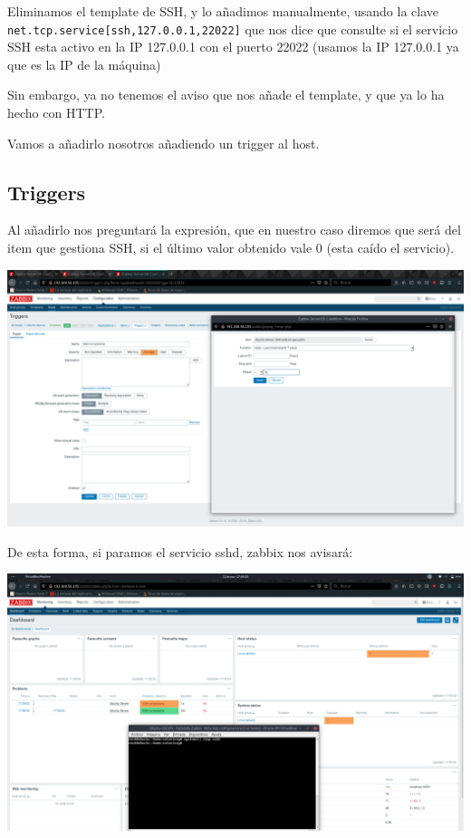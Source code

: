 \documentclass[12pt, spanish]{article}
\begin{document}
Eliminamos el template de SSH, y lo añadimos manualmente, usando la clave \\
\texttt{net.tcp.service[ssh,127.0.0.1,22022]} que nos dice que consulte si el servicio SSH esta activo en la IP 127.0.0.1 con el puerto 22022 (usamos la IP 127.0.0.1 ya que es la IP de la máquina)

Sin embargo, ya no tenemos el aviso que nos añade el template, y que ya lo ha hecho con HTTP.

Vamos a añadirlo nosotros añadiendo un trigger al host.

\subsection{Triggers}

Al añadirlo nos preguntará la expresión, que en nuestro caso diremos que será del item que gestiona SSH, si el último valor obtenido vale 0 (esta caído el servicio).
\begin{center}
\includegraphics[scale=0.25]{ssh_trigger.png}
\end{center}


De esta forma, si paramos el servicio sshd, zabbix nos avisará:

\begin{center}
\includegraphics[scale=0.25]{ssh_stop.png}
\end{center}
\end{document}
